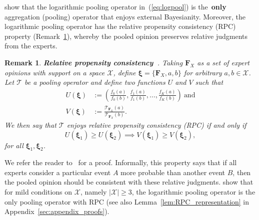 \documentclass[12pt]{article}
\newtheorem{remark}{Remark}[]
\begin{document}
\textcite{Genest1984} show that the logarithmic pooling operator in~(\ref{eq:logpool}) is the~\textbf{only} aggregation (pooling) operator that enjoys external Bayesianity.
Moreover, the logarithmic pooling operator has the relative propensity consistency (RPC) property (Remark~\ref{rmk:properties_RPC}), whereby the pooled opinion preserves relative judgments from the experts.
\begin{remark}
\label{rmk:properties_RPC}
\textbf{Relative propensity consistency~\parencite{Genest1984}}.
Taking $\boldsymbol F_{X}$ as a set of expert opinions with support on a space $\mathcal{X}$, define $\boldsymbol \xi = \{\boldsymbol F_{X}, a, b\}$ for arbitrary $a , b \in \mathcal{X}$.
Let $\mathcal{T}$ be a pooling operator and define two functions $U$ and $V$ such that 
\begin{align}
 U(\boldsymbol \xi) &:= \left( \frac{f_0(a)}{f_0(b)}, \frac{f_1(a)}{f_1(b)}, \ldots, \frac{f_K(a)}{f_K(b)} \right)\:\text{and}\\
 V(\boldsymbol \xi) & := \frac{\mathcal{T}_{\boldsymbol F_{X}} (a)}{\mathcal{T}_{\boldsymbol F_{X}} (b)}.
\end{align}
We then say that $\mathcal{T}$ enjoys \textit{relative propensity consistency} (RPC) if and only if
\begin{equation}
 U(\boldsymbol \xi_1) \geq U(\boldsymbol \xi_2) \implies  V(\boldsymbol \xi_1) \geq V(\boldsymbol \xi_2),
\end{equation}
for all $\boldsymbol \xi_1, \boldsymbol \xi_2$.
\end{remark}
We refer the reader to~\textcite{Genest1984} for a proof.
Informally, this property says that if all experts consider a particular event $A$ more probable than another event $B$, then the pooled opinion should be consistent with these relative judgments. 
\textcite{Genest1984} show that for mild conditions on $\mathcal{X}$, namely $|\mathcal{X}| \geq 3$, the logarithmic pooling operator is the only pooling operator with RPC (see also Lemma~\ref{lem:RPC_representation} in Appendix~\ref{sec:appendix_proofs}).
\end{document}

